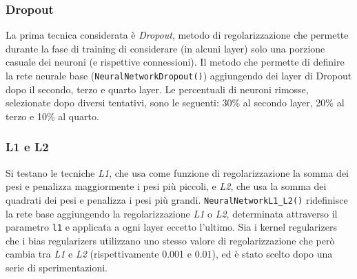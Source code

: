 




\subsubsection{Dropout}
La prima tecnica considerata è \textit{Dropout}, metodo di regolarizzazione che permette durante la fase di training di considerare (in alcuni layer) solo una porzione casuale dei neuroni (e rispettive connessioni).
Il metodo che permette di definire la rete neurale base (\texttt{NeuralNetworkDropout()}) aggiungendo dei layer di Dropout dopo il secondo, terzo e quarto layer. Le percentuali di neuroni rimosse, selezionate dopo diversi tentativi, sono le seguenti: 30\% al secondo layer, 20\% al terzo e 10\% al quarto.

\subsubsection{L1 e L2}
Si testano le tecniche \textit{L1}, che usa come funzione di regolarizzazione la somma dei pesi e penalizza maggiormente i pesi più piccoli, e \textit{L2}, che usa la somma dei quadrati dei pesi e penalizza i pesi più grandi.
\texttt{NeuralNetworkL1\_L2()} ridefinisce la rete base aggiungendo la regolarizzazione \textit{L1} o \textit{L2}, determinata attraverso il parametro \texttt{l1} e applicata a ogni layer eccetto l'ultimo. Sia i kernel regularizers che i bias regularizers utilizzano uno stesso valore di regolarizzazione che però cambia tra \textit{L1} e \textit{L2} (rispettivamente 0.001 e 0.01), ed è stato scelto dopo una serie di sperimentazioni.


